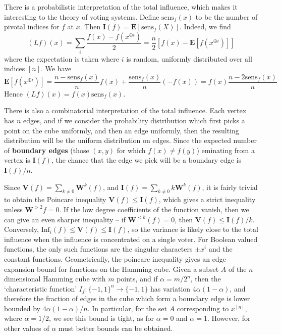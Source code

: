 There is a probabilistic interpretation of the total influence, which makes it interesting to the theory of voting systems. Define $\text{sens}_f(x)$ to be the number of pivotal indices for $f$ at $x$. Then $\mathbf{I}(f) = \mathbf{E}[\text{sens}_f(X)]$. Indeed, we find
%
\[ (Lf)(x) = \sum_i \frac{f(x) - f(x^{\oplus i})}{2} = \frac{n}{2} [f(x) - \mathbf{E}[f(x^{\oplus i})]] \]
%
where the expectation is taken where $i$ is random, uniformly distributed over all indices $[n]$. We have
%
\[ \mathbf{E}[f(x^{\oplus i})] = \frac{n - \text{sens}_f(x)}{n} f(x) + \frac{\text{sens}_f(x)}{n} (-f(x)) = f(x) \frac{n - 2 \text{sens}_f(x)}{n} \]
%
Hence $(Lf)(x) = f(x) \text{sens}_f(x)$.

There is also a combinatorial interpretation of the total influence. Each vertex has $n$ edges, and if we consider the probability distribution which first picks a point on the cube uniformly, and then an edge uniformly, then the resulting distribution will be the uniform distribution on edges. Since the expected number of {\bf boundary edges} (those $(x,y)$ for which $f(x) \neq f(y)$) eminating from a vertex is $\mathbf{I}(f)$, the chance that the edge we pick will be a boundary edge is $\mathbf{I}(f)/n$.

Since $\mathbf{V}(f) = \sum_{k \neq 0} \mathbf{W}^k(f)$, and $\mathbf{I}(f) = \sum_{k \neq 0} k\mathbf{W}^k(f)$, it is fairly trivial to obtain the Poincare inequality $\mathbf{V}(f) \leq \mathbf{I}(f)$, which gives a strict inequality unless $\mathbf{W}^{> 2}f = 0$. If the low degree coefficients of the function vanish, then we can give an even sharper inequality -- if $\mathbf{W}^{< k}(f) = 0$, then $\mathbf{V}(f) \leq \mathbf{I}(f)/k$. Conversely, $\text{Inf}_i(f) \leq \mathbf{V}(f) \leq \mathbf{I}(f)$, so the variance is likely close to the total influence when the influence is concentrated on a single voter. For Boolean valued functions, the only such functions are the singular characters $\pm x^i$ and the constant functions. Geometrically, the poincare inequality gives an edge expansion bound for functions on the Hamming cube. Given a subset $A$ of the $n$ dimensional Hamming cube with $m$ points, and if $\alpha = m/2^n$, then the `characteristic function' $I_f: \{ -1, 1 \}^n \to \{ -1, 1 \}$ has variation $4 \alpha (1 - \alpha)$, and therefore the fraction of edges in the cube which form a boundary edge is lower bounded by $4\alpha(1-\alpha)/n$. In particular, for the set $A$ corresponding to $x^{[n]}$, where $\alpha = 1/2$, we see this bound is tight, as for $\alpha = 0$ and $\alpha = 1$. However, for other values of $\alpha$ must better bounds can be obtained.

